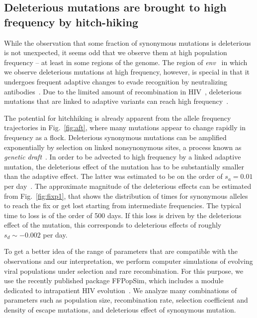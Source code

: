 \documentclass[rmp, twocolumn]{revtex4}
\newcommand{\env}{\textit{env}}
\newcommand{\FIG}[1]{Fig.~\ref{fig:#1}}
\begin{document}
\subsection{Deleterious mutations are brought to high frequency by hitch-hiking}

While the observation that some fraction of synonymous mutations is deleterious
is not unexpected, it seems odd that we observe them at high population
frequency -- at least in some regions of the genome. The region of \env~ in
which we observe deleterious mutations at high frequency, however, is special in
that it undergoes frequent adaptive changes to evade recognition by neutralizing
antibodies~\cite{williamson_adaptation_2003}. Due to the limited amount of
recombination in HIV~\cite{neher_recombination_2010,batorsky_estimate_2011},
deleterious mutations that are linked to adaptive variants can reach high
frequency~\citep{smith_hitch-hiking_1974}.

The potential for hitchhiking is already apparent from the allele frequency
trajectories in \FIG{aft}, where many mutations appear to change rapidly in
frequency as a flock. Deleterious synonymous mutations can be amplified
exponentially by selection on linked nonsynonymous sites, a process known as
{\it genetic draft}~\citep{gillespie_genetic_2000, neher_genetic_2011}. In order
to be advected to high frequency by a linked adaptive mutation, the deleterious
effect of the mutation has to be substantially smaller than the adaptive effect.
The latter was estimated to be on the order of $s_a = 0.01$ per day~\citep{neher_recombination_2010}.
The approximate magnitude of the deleterious effects can be estimated from
\FIG{fixp1}, that shows the distribution of times for synonymous
alleles to reach the fix or get lost starting from intermediate frequencies. The
typical time to loss is of the order of 500 days. If this loss is driven by the
deleterious effect of the mutation, this corresponds to deleterious effects of
roughly $s_d \sim - 0.002$ per day.

To get a better idea of the range of parameters that are compatible with the
observations and our interpretation, we  perform computer simulations of
evolving viral populations under selection and rare recombination. For this
purpose, we use the recently published package FFPopSim, which includes a module
dedicated to intrapatient HIV evolution~\citep{zanini_ffpopsim:_2012}. We
analyze many combinations of parameters such as population size, recombination
rate, selection coefficient and density of escape mutations, and deleterious effect
of synonymous mutation.
\end{document}
